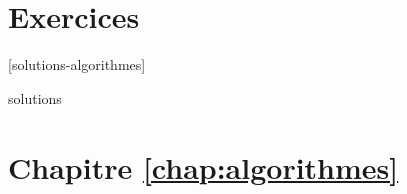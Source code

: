 \section{Exercices}
\label{sec:algorithmes:exercices}

[solutions-algorithmes]

\begin{Filesave}{solutions}
\section*{Chapitre \ref*{chap:algorithmes}}

\begingroup

\end{Filesave}

